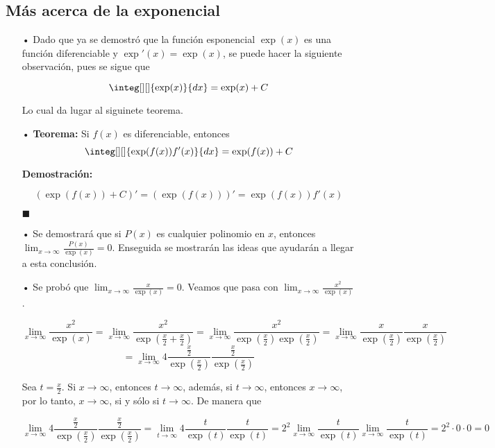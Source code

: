\documentclass[pts12]{article}
\numberwithin{equation}{section}
\newcommand{\Col}{\color{ProcessBlue}}
\begin{document}
\subsection{\Col Más acerca de la exponencial}

\begin{itemize}
\item[\Col •] Dado que ya se demostró que la función esponencial $\exp(x)$ es una función diferenciable y $\exp'(x)=\exp(x)$, se puede hacer la siguiente observación, pues se sigue que 

$$ \integ[][]{\exp(x)}{dx}=\exp(x)+C $$

Lo cual da lugar al siguinete teorema.

\item[\Col •] \textbf{Teorema:} Si $f(x)$ es diferenciable, entonces 
$$ \integ[][]{\exp(f(x))f'(x)}{dx}=\exp(f(x))+C $$

\textbf{Demostración:}

$$ {(\exp(f(x))+C)'}={(\exp(f(x)))'}=\exp(f(x))f'(x) $$

\begin{flushright}
$\blacksquare$
\end{flushright}

\item[\Col •] Se demostrará que si $P(x)$ es cualquier polinomio en $x$, entonces $\lim_{x\to\infty}\frac{P(x)}{\exp(x)}=0$. Enseguida se mostrarán las ideas que ayudarán a llegar a esta conclusión.

\item[\Col •] Se probó que $\lim_{x\to\infty}\frac{x}{\exp(x)}=0$. Veamos que pasa con $\lim_{x\to\infty}\frac{x^2}{\exp(x)}$.

$$ \lim_{x\to\infty}\frac{x^2}{\exp(x)}=\lim_{x\to\infty}\frac{x^2}{\exp(\frac{x}{2}+\frac{x}{2})}=\lim_{x\to\infty}\frac{x^2}{\exp(\frac{x}{2})\exp(\frac{x}{2})}=\lim_{x\to\infty}\frac{x}{\exp(\frac{x}{2})}\frac{x}{\exp(\frac{x}{2})} $$
$$ =\lim_{x\to\infty}4\frac{\frac{x}{2}}{\exp(\frac{x}{2})}\frac{\frac{x}{2}}{\exp(\frac{x}{2})} $$

Sea $t=\frac{x}{2}$. Si $x\to \infty$, entonces $t\to \infty$, además, si $t\to \infty$, entonces $x\to \infty$, por lo tanto, $x\to \infty$, si y sólo si $t\to \infty$. De manera que

$$ \lim_{x\to\infty}4\frac{\frac{x}{2}}{\exp(\frac{x}{2})}\frac{\frac{x}{2}}{\exp(\frac{x}{2})}=\lim_{t\to\infty}4\frac{t}{\exp(t)}\frac{t}{\exp(t)}=2^2\lim_{x\to\infty}\frac{t}{\exp(t)}\lim_{x\to\infty}\frac{t}{\exp(t)}=2^2\cdot 0\cdot 0=0 $$


\end{itemize}
\end{document}
